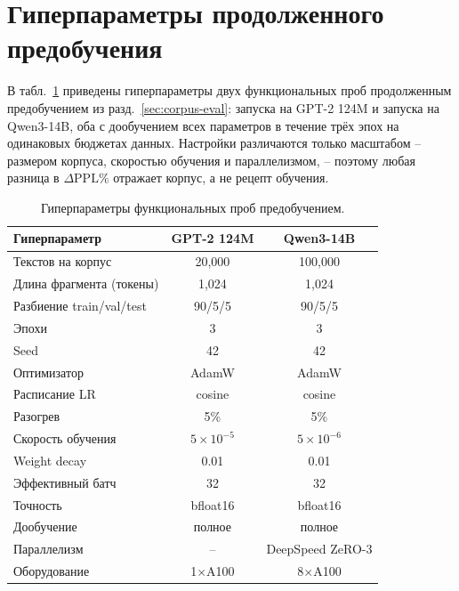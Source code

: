 \documentclass{article}
\begin{document}





\newpage
\appendix

\section{Гиперпараметры продолженного предобучения}\label{app:pretrain-setup}

В табл.~\ref{tab:pretrain-hparams} приведены гиперпараметры двух функциональных проб продолженным предобучением из разд.~\ref{sec:corpus-eval}: запуска на GPT-2 124M и запуска на Qwen3-14B, оба с дообучением всех параметров в течение трёх эпох на одинаковых бюджетах данных. Настройки различаются только масштабом -- размером корпуса, скоростью обучения и параллелизмом, -- поэтому любая разница в $\Delta\mathrm{PPL}\%$ отражает корпус, а не рецепт обучения.

\begin{table}[ht]
\centering
\caption{Гиперпараметры функциональных проб предобучением.}
\label{tab:pretrain-hparams}
\begin{tabular}{lcc}
\toprule
\textbf{Гиперпараметр} & \textbf{GPT-2 124M} & \textbf{Qwen3-14B} \\
\midrule
Текстов на корпус       & 20{,}000            & 100{,}000 \\
Длина фрагмента (токены) & 1{,}024            & 1{,}024 \\
Разбиение train/val/test & 90/5/5             & 90/5/5 \\
Эпохи                   & 3                   & 3 \\
Seed                    & 42                  & 42 \\
Оптимизатор             & AdamW               & AdamW \\
Расписание LR           & cosine              & cosine \\
Разогрев                & 5\%                 & 5\% \\
Скорость обучения       & $5\times10^{-5}$    & $5\times10^{-6}$ \\
Weight decay            & 0.01                & 0.01 \\
Эффективный батч        & 32                  & 32 \\
Точность                & bfloat16            & bfloat16 \\
Дообучение              & полное              & полное \\
Параллелизм             &  --                 & DeepSpeed ZeRO-3 \\
Оборудование            & 1$\times$A100       & 8$\times$A100 \\
\bottomrule
\end{tabular}
\end{table}
\end{document}
